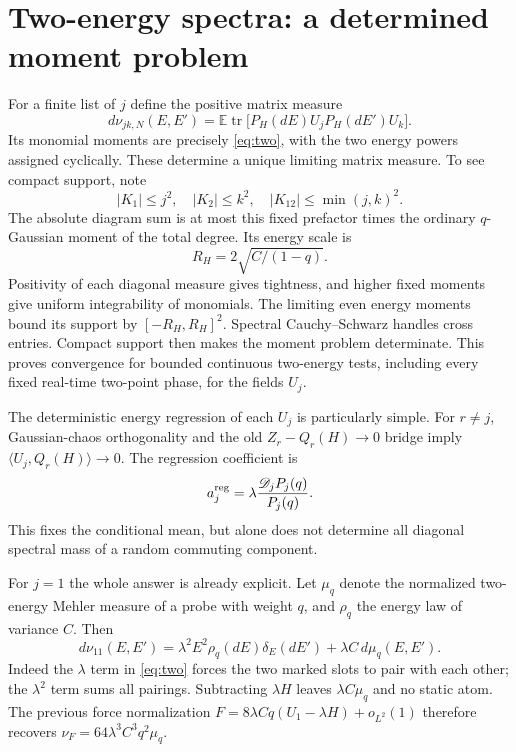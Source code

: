 \documentclass[11pt]{article}
\newcommand{\EE}{\mathbb E}
\newcommand{\tr}{\operatorname{tr}}
\begin{document}
\newpage
\section{Two-energy spectra: a determined moment problem}
For a finite list of $j$ define the positive matrix measure
\begin{equation}
 d\nu_{jk,N}(E,E')=
 \EE\tr\bigl[P_H(dE)U_jP_H(dE')U_k\bigr].
\end{equation}
Its monomial moments are precisely \eqref{eq:two}, with the two
energy powers assigned cyclically. These determine a unique limiting
matrix measure. To see compact support, note
\begin{equation}
 |K_1|\le j^2,\quad |K_2|\le k^2,
 \quad |K_{12}|\le\min(j,k)^2.
\end{equation}
The absolute diagram sum is at most this fixed prefactor times the
ordinary $q$-Gaussian moment of the total degree. Its energy scale is
\begin{equation}
 R_H=2\sqrt{C/(1-q)}.
\end{equation}
Positivity of each diagonal measure gives tightness, and higher
fixed moments give uniform integrability of monomials. The limiting
even energy moments bound its support by $[-R_H,R_H]^2$.
Spectral Cauchy--Schwarz handles cross entries. Compact support then
makes the moment problem determinate. This proves convergence for
bounded continuous two-energy tests, including every fixed real-time
two-point phase, for the fields $U_j$.

The deterministic energy regression of each $U_j$ is particularly
simple. For $r\ne j$, Gaussian-chaos orthogonality and the old
$Z_r-Q_r(H)\to0$ bridge imply
$\langle U_j,Q_r(H)\rangle\to0$. The regression coefficient is
\begin{equation}
 a_j^{\rm reg}=\lambda\frac{\mathscr D_jP_j(q)}{P_j(q)}.
\end{equation}
This fixes the conditional mean, but alone does not determine all
diagonal spectral mass of a random commuting component.

For $j=1$ the whole answer is already explicit. Let $\mu_q$ denote
the normalized two-energy Mehler measure of a probe with weight $q$,
and $\rho_q$ the energy law of variance $C$. Then
\begin{equation}
 d\nu_{11}(E,E')=
 \lambda^2 E^2\rho_q(dE)\delta_E(dE')+\lambda C\,d\mu_q(E,E').
\end{equation}
Indeed the $\lambda$ term in \eqref{eq:two} forces the two marked
slots to pair with each other; the $\lambda^2$ term sums all pairings.
Subtracting $\lambda H$ leaves $\lambda C\mu_q$ and no static atom.
The previous force normalization $F=8\lambda Cq(U_1-\lambda H)+o_{L^2}(1)$
therefore recovers $\nu_F=64\lambda^3C^3q^2\mu_q$.
\end{document}
